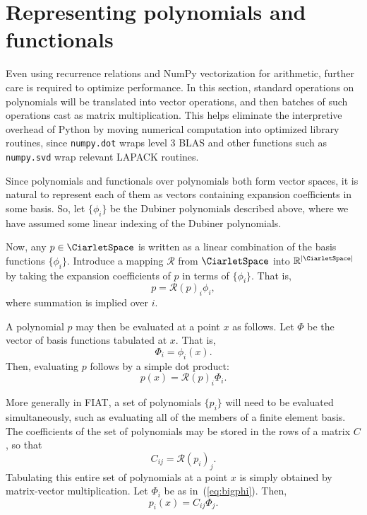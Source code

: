 \section{Representing polynomials and functionals}

Even using recurrence relations and NumPy vectorization for
arithmetic, further care is required to optimize performance.  In this
section, standard operations on polynomials will be translated into
vector operations, and then batches of such operations cast as matrix
multiplication.  This helps eliminate the interpretive overhead of Python
by moving numerical computation into optimized library routines,
since \texttt{numpy.dot} wraps level 3 BLAS and other functions such as
\texttt{numpy.svd} wrap relevant LAPACK routines.


Since polynomials and functionals over polynomials both form vector
spaces, it is natural to represent each of them as vectors containing
expansion coefficients in some basis.  So, let \( \{ \phi_i \} \) be the
Dubiner polynomials described above, where we have assumed
some linear indexing of the Dubiner polynomials.

Now, any \( p \in \CiarletSpace \) is written as a linear combination of the basis
functions \( \{ \phi_i \} \).  Introduce a mapping \( \mathcal{R} \) from
\( \CiarletSpace \) into \( \mathbb{R}^{|\CiarletSpace|} \) by taking the expansion coefficients
of \( p \) in terms of \( \{ \phi_i \} \).  That is,
\[
p = \mathcal{R}(p)_i \phi_i,
\]
where summation is implied over \( i \).

A polynomial \( p \) may then be evaluated at a point \( x \) as follows.
Let \( \Phi \) be the vector of basis functions tabulated at \( x \).
That is,
\begin{equation}
\label{eq:bigphi}
\Phi_i = \phi_i(x).
\end{equation}
Then, evaluating \( p \) follows by a simple dot product:
\begin{equation}
\label{eq:doteval}
p(x) = \mathcal{R}(p)_i \Phi_i.
\end{equation}

More generally in FIAT, a set of polynomials \( \{ p_i \} \) will need
to be evaluated simultaneously, such as evaluating all of the members
of a finite element basis.  The coefficients of the set of polynomials
may be stored in the rows of a matrix \( C \), so that
\[
C_{ij} = \mathcal{R}(p_i)_j.
\]
Tabulating this entire set of polynomials at a point \( x \) is simply
obtained by matrix-vector multiplication.  Let \( \Phi_i \) be as
in~(\ref{eq:bigphi}).  Then,
\[
p_i(x) = C_{ij} \Phi_j.
\]

